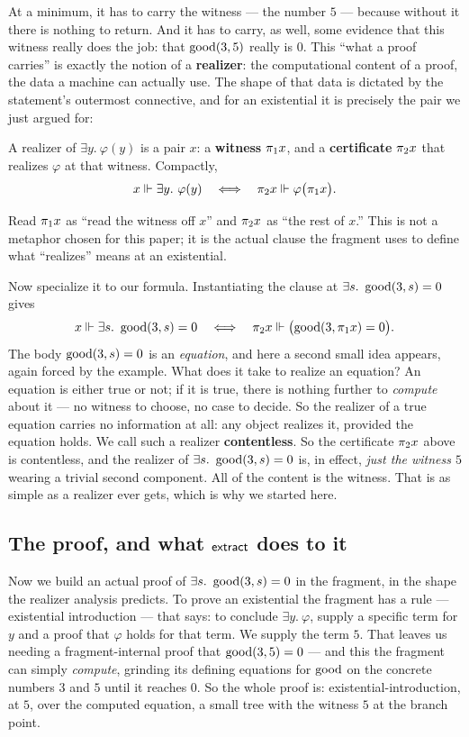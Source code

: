 \documentclass[11pt]{article}
\begin{document}
At a minimum, it has to carry the witness --- the number $5$ --- because
without it there is nothing to return. And it has to carry, as well, some
evidence that this witness really does the job: that $\operatorname{good}(3,5)$ really is
$0$. This ``what a proof carries'' is exactly the notion of a
\textbf{realizer}: the computational content of a proof, the data a machine
can actually use. The shape of that data is dictated by the statement's
outermost connective, and for an existential it is precisely the pair we
just argued for:
\begin{keystmt}
A realizer of $\exists y.\ \varphi(y)$ is a pair $x$: a \textbf{witness}
$\pi_1 x$, and a \textbf{certificate} $\pi_2 x$ that realizes $\varphi$ at that
witness. Compactly,
\[
  x \Vdash \exists y.\ \varphi(y)
  \quad\Longleftrightarrow\quad
  \pi_2 x \Vdash \varphi\bigl(\pi_1 x\bigr).
\]
\end{keystmt}
Read $\pi_1 x$ as ``read the witness off $x$'' and $\pi_2 x$ as ``the rest of
$x$.'' This is not a metaphor chosen for this paper; it is the actual clause
the fragment uses to define what ``realizes'' means at an existential.

Now specialize it to our formula. Instantiating the clause at
$\exists s.\ \good(3,s)=0$ gives
\[
  x \Vdash \exists s.\ \operatorname{good}(3,s)=0
  \quad\Longleftrightarrow\quad
  \pi_2 x \Vdash \bigl(\operatorname{good}(3,\pi_1 x)=0\bigr).
\]
The body $\operatorname{good}(3,s)=0$ is an \emph{equation}, and here a second small idea
appears, again forced by the example. What does it take to realize an
equation? An equation is either true or not; if it is true, there is nothing
further to \emph{compute} about it --- no witness to choose, no case to
decide. So the realizer of a true equation carries no information at all: any
object realizes it, provided the equation holds. We call such a realizer
\textbf{contentless}. So the certificate $\pi_2 x$ above is contentless, and
the realizer of $\exists s.\ \good(3,s)=0$ is, in effect, \emph{just the
witness $5$} wearing a trivial second component. All of the content is the
witness. That is as simple as a realizer ever gets, which is why we started
here.

\subsection*{The proof, and what \texorpdfstring{$\mathsf{extract}$}{extract} does to it}

Now we build an actual proof of $\exists s.\ \good(3,s)=0$ in the fragment,
in the shape the realizer analysis predicts. To prove an existential the
fragment has a rule --- existential introduction --- that says: to conclude
$\exists y.\ \varphi$, supply a specific term for $y$ and a proof that
$\varphi$ holds for that term. We supply the term $5$. That leaves us needing
a fragment-internal proof that $\operatorname{good}(3,5)=0$ --- and this the fragment can
simply \emph{compute}, grinding its defining equations for $\operatorname{good}$ on the
concrete numbers $3$ and $5$ until it reaches $0$. So the whole proof is:
existential-introduction, at $5$, over the computed equation, a small tree
with the witness $5$ at the branch point.
\end{document}
